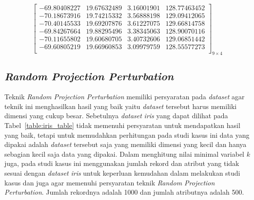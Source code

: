 \begin{enumerate}
\begin{equation}
\begin{bmatrix}
            -69.80408227&19.67632489&3.16001901&128.77463452 \\
            -70.18673916&19.74215332&3.56888198&129.09412065 \\
            -70.40145533&19.69207876&3.61227075&129.66814758 \\
            -69.84267664&19.88295496&3.38345063&128.90070116 \\
            -70.11655802&19.60680705&3.40732606&129.06851442 \\
            -69.60805219&19.66960853&3.09979759&128.55577273 \\
        \end{bmatrix}_{9\times 4}
    \end{equation}
\end{enumerate} 

\subsection{\textit{Random Projection Perturbation}}
\label{subsec:studi-rpp}

Teknik \textit{Random Projection Perturbation} memiliki persyaratan pada \textit{dataset} agar teknik ini menghasilkan hasil yang baik yaitu \textit{dataset} tersebut harus memiliki dimensi yang cukup besar. Sebetulnya \textit{dataset} \textit{iris} yang dapat dilihat pada Tabel~\ref{table:iris_table} tidak memenuhi persyaratan untuk mendapatkan hasil yang baik, tetapi untuk memudahkan perhitungan pada studi kasus ini data yang dipakai adalah \textit{dataset} tersebut saja yang memiliki dimensi yang kecil dan hanya sebagian kecil saja data yang dipakai. Dalam menghitung nilai minimal variabel \(k\) juga, pada studi kasus ini menggunakan jumlah rekord dan atribut yang tidak sesuai dengan \textit{dataset} \textit{iris} untuk keperluan kemudahan dalam melakukan studi kasus dan juga agar memenuhi persyaratan teknik \textit{Random Projection Perturbation}. Jumlah rekordnya adalah 1000 dan jumlah atributnya adalah 500.

